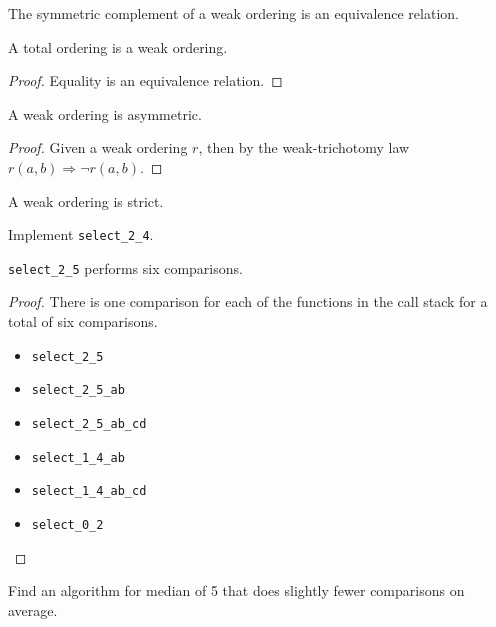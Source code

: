 \begin{lemma}
	The symmetric complement of a weak ordering is an equivalence relation.
\end{lemma}

\begin{lemma}
	A total ordering is a weak ordering.
\end{lemma}

\begin{proof}
	Equality is an equivalence relation.
\end{proof}

\begin{lemma}
	A weak ordering is asymmetric.
\end{lemma}

\begin{proof}
	Given a weak ordering $r$, then by the weak-trichotomy law $r(a, b) \Rightarrow \lnot r(a, b)$.
\end{proof}

\begin{lemma}
	A weak ordering is strict.
\end{lemma}

\begin{exercise}
	Implement \verb|select_2_4|.
\end{exercise}



\begin{lemma}
	\verb|select_2_5| performs six comparisons.
\end{lemma}

\begin{proof}
	There is one comparison for each of the functions in the call stack for a
	total of six comparisons.
	\begin{itemize}
		\item \verb|select_2_5|
		\item \verb|select_2_5_ab|
		\item \verb|select_2_5_ab_cd|
		\item \verb|select_1_4_ab|
		\item \verb|select_1_4_ab_cd|
		\item \verb|select_0_2|
	\end{itemize}
\end{proof}

\begin{exercise}
	Find an algorithm for median of 5 that does slightly fewer comparisons
	on average.
\end{exercise}

